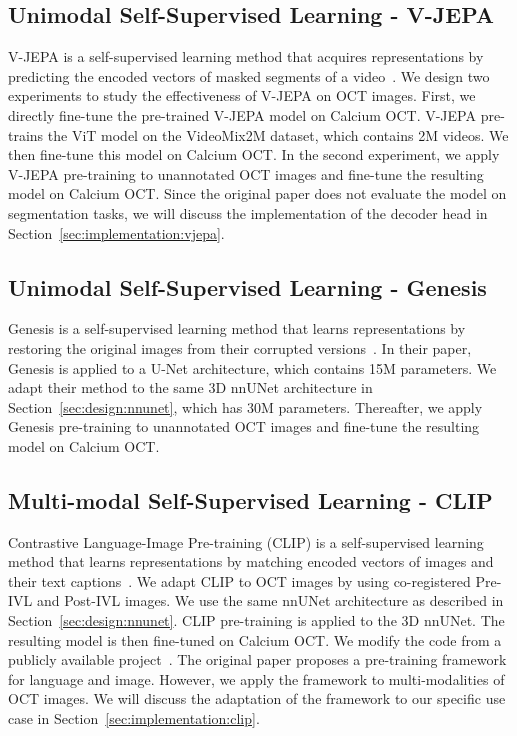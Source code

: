 \documentclass[a4paper,11pt,oneside]{report}
\begin{document}
\subsection{Unimodal Self-Supervised Learning - V-JEPA}
V-JEPA is a self-supervised learning method that acquires representations by predicting the encoded vectors of masked segments of a video~\cite{Bardes2024Vjepa}. We design two experiments to study the effectiveness of V-JEPA on OCT images. First, we directly fine-tune the pre-trained V-JEPA model on Calcium OCT. V-JEPA pre-trains the ViT model on the VideoMix2M dataset, which contains 2M videos. We then fine-tune this model on Calcium OCT. In the second experiment, we apply V-JEPA pre-training to unannotated OCT images and fine-tune the resulting model on Calcium OCT. Since the original paper does not evaluate the model on segmentation tasks, we will discuss the implementation of the decoder head in Section~\ref{sec:implementation:vjepa}.


\subsection{Unimodal Self-Supervised Learning - Genesis}
Genesis is a self-supervised learning method that learns representations by restoring the original images from their corrupted versions~\cite{Zhou2021}. In their paper, Genesis is applied to a U-Net architecture, which contains 15M parameters. We adapt their method to the same 3D nnUNet architecture in Section~\ref{sec:design:nnunet}, which has 30M parameters. Thereafter, we apply Genesis pre-training to unannotated OCT images and fine-tune the resulting model on Calcium OCT.


\subsection{Multi-modal Self-Supervised Learning - CLIP}
Contrastive Language-Image Pre-training (CLIP) is a self-supervised learning method that learns representations by matching encoded vectors of images and their text captions~\cite{Radford2021CLIP}. We adapt CLIP to OCT images by using co-registered Pre-IVL and Post-IVL images. We use the same nnUNet architecture as described in Section~\ref{sec:design:nnunet}. CLIP pre-training is applied to the 3D nnUNet. The resulting model is then fine-tuned on Calcium OCT. We modify the code from a publicly available project~\cite{Shariatnia2021}. The original paper proposes a pre-training framework for language and image. However, we apply the framework to multi-modalities of OCT images. We will discuss the adaptation of the framework to our specific use case in Section~\ref{sec:implementation:clip}.
\end{document}

